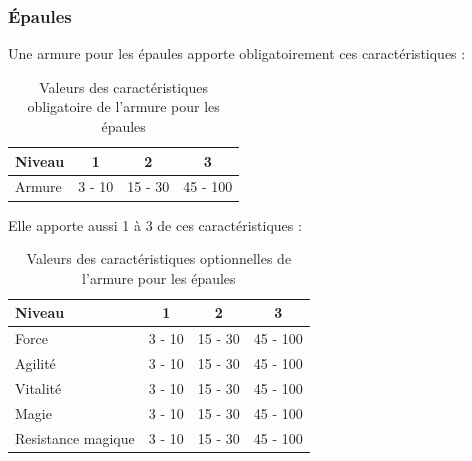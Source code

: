 \documentclass[11pt, a4paper, oneside]{report}
\begin{document}
\subsubsection{Épaules}
Une armure pour les épaules apporte obligatoirement ces caractéristiques :
\begin{table}[H]
\begin{center}
\begin{tabular}{| l | c | c | c |}
  \hline      
  Niveau 				& 1 & 2 & 3\\ \hline \hline
  Armure 				& 3 - 10 & 15 - 30 & 45 - 100\\ \hline
\end{tabular}
\caption{Valeurs des caractéristiques obligatoire de l'armure pour les épaules}
\end{center}
\end{table}
Elle apporte aussi 1 à 3 de ces caractéristiques :
\begin{table}[H]
\begin{center}
\begin{tabular}{| l | c | c | c |}
  \hline      
  Niveau 				& 1 & 2 & 3\\ \hline \hline                 
  Force 				& 3 - 10 & 15 - 30 & 45 - 100\\ \hline
  Agilité 				& 3 - 10 & 15 - 30 & 45 - 100\\ \hline
  Vitalité 				& 3 - 10 & 15 - 30 & 45 - 100\\ \hline
  Magie 				& 3 - 10 & 15 - 30 & 45 - 100\\ \hline
  Resistance magique 	& 3 - 10 & 15 - 30 & 45 - 100\\ \hline
\end{tabular}
\caption{Valeurs des caractéristiques optionnelles de l'armure pour les épaules}
\end{center}
\end{table}
\end{document}
